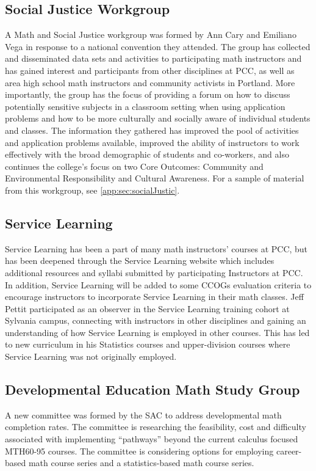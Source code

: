 \subsection{Social Justice Workgroup}\label{cur:sub:socialJustic}
A Math and Social Justice workgroup was formed by Ann Cary and Emiliano Vega in
response to a national convention they attended. The group has collected and
disseminated data sets and activities to participating math instructors and has
gained interest and participants from other disciplines at PCC, as well as area
high school math instructors and community activists in Portland. More
importantly, the group has the focus of providing a forum on how to discuss
potentially sensitive subjects in a classroom setting when using application
problems and how to be more culturally and socially aware of individual students
and classes. The information they gathered has improved the pool of activities and application problems
available, improved the ability of instructors to work effectively with the
broad demographic of students and co-workers, and also continues the college's
focus on two Core Outcomes: Community and Environmental Responsibility and
Cultural Awareness. For a sample of material from this workgroup, see
\vref{app:sec:socialJustic}.

\subsection{Service Learning}\label{other:sec:servicelearning}
Service Learning has been a part of many math instructors' courses at PCC, but
has been deepened through the Service Learning website
which includes additional resources and syllabi submitted
by participating Instructors at PCC. In addition, Service Learning will be
added to some CCOGs evaluation criteria to encourage instructors to incorporate
Service Learning in their math classes. Jeff Pettit participated as
an observer in the Service Learning training cohort at Sylvania campus,
connecting with instructors in other disciplines and gaining an understanding of 
how Service Learning is employed in other courses. This has led to new curriculum in his
Statistics courses and upper-division courses where Service Learning was not
originally employed.

\subsection{Developmental Education Math Study Group}
A new committee was formed by the SAC to address developmental math completion
rates. The committee is researching the feasibility, cost and difficulty
associated with implementing ``pathways'' beyond the current calculus focused
MTH60-95 courses. The committee is considering options for employing
career-based math course series and a statistics-based math course series.

